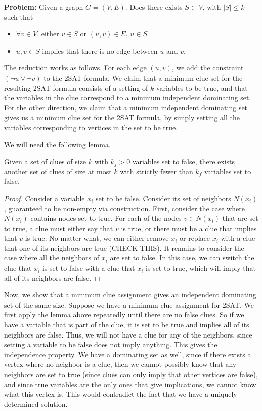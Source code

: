 \documentclass[runningheads,a4paper]{llncs}
\begin{document}
\noindent\textbf{Problem:} Given a graph $G = (V, E)$. Does there exists $S \subset V$, with $|S| \leq k$ such that 
\begin{itemize}
\item $\forall v \in V$, either $v \in S$ or $(u, v) \in E$, $u \in S$ 
\item $u, v \in S$ implies that there is no edge between $u$ and $v$. 
\end{itemize}

The reduction works as follows. For each edge $(u,v)$, we add the constraint $(\neg u \vee \neg v)$ to the 2SAT formula. We claim that a minimum clue set for the resulting 2SAT formula consists of a setting of $k$ variables to be true, and that the variables in the clue correspond to a minimum independent dominating set. For the other direction, we claim that a minimum independent dominating set gives us a minimum clue set for the 2SAT formula, by simply setting all the variables corresponding to vertices in the set to be true.

We will need the following lemma.

\begin{lemma} Given a set of clues of size $k$ with $k_f > 0$ variables set to false, there exists another set of clues of size at most $k$ with strictly fewer than $k_f$ variables set to false.
\end{lemma}

\begin{proof} 
Consider a variable $x_i$ set to be false. Consider its set of neighbors $N(x_i)$, guaranteed to be non-empty via construction. First, consider the case where $N(x_i)$ contains nodes set to true. For each of the nodes $v \in N(x_i)$ that are set to true, a clue must either say that $v$ is true, or there must be a clue that implies that $v$ is true. No matter what, we can either remove $x_i$ or replace $x_i$ with a clue that one of its neighbors are true (CHECK THIS). It remains to consider the case where all the neighbors of $x_i$ are set to false. In this case, we can switch the clue that $x_i$ is set to false with a clue that $x_i$ is set to true, which will imply that all of its neighbors are false.
\end{proof}

Now, we show that a minimum clue assignment gives an independent dominating set of the same size. Suppose we have a minimum clue assignment for 2SAT. We first apply the lemma above repeatedly until there are no false clues. So if we have a variable that is part of the clue, it is set to be true and implies all of its neighbors are false. Thus, we will not have a clue for any of the neighbors, since setting a variable to be false does not imply anything. This gives the independence property. We have a dominating set as well, since if there exists a vertex where no neighbor is a clue, then we cannot possibly know that any neighbors are set to true (since clues can only imply that other vertices are false), and since true variables are the only ones that give implications, we cannot know what this vertex is. This would contradict the fact that we have a uniquely determined solution.
\end{document}
